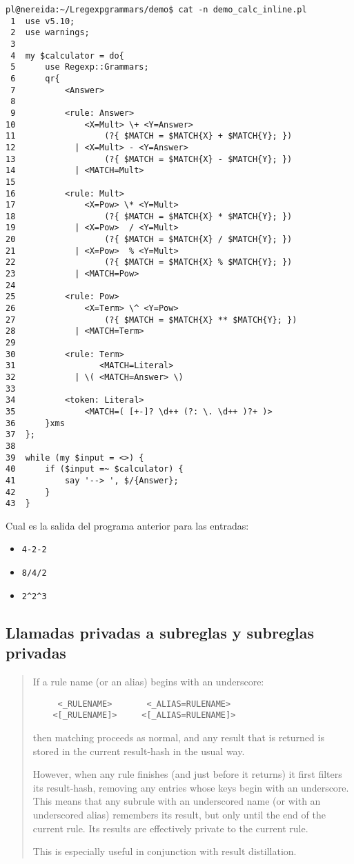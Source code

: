 \begin{verbatim}
pl@nereida:~/Lregexpgrammars/demo$ cat -n demo_calc_inline.pl
 1  use v5.10;
 2  use warnings;
 3
 4  my $calculator = do{
 5      use Regexp::Grammars;
 6      qr{
 7          <Answer>
 8
 9          <rule: Answer>
10              <X=Mult> \+ <Y=Answer>
11                  (?{ $MATCH = $MATCH{X} + $MATCH{Y}; })
12            | <X=Mult> - <Y=Answer>
13                  (?{ $MATCH = $MATCH{X} - $MATCH{Y}; })
14            | <MATCH=Mult>
15
16          <rule: Mult>
17              <X=Pow> \* <Y=Mult>
18                  (?{ $MATCH = $MATCH{X} * $MATCH{Y}; })
19            | <X=Pow>  / <Y=Mult>
20                  (?{ $MATCH = $MATCH{X} / $MATCH{Y}; })
21            | <X=Pow>  % <Y=Mult>
22                  (?{ $MATCH = $MATCH{X} % $MATCH{Y}; })
23            | <MATCH=Pow>
24
25          <rule: Pow>
26              <X=Term> \^ <Y=Pow>
27                  (?{ $MATCH = $MATCH{X} ** $MATCH{Y}; })
28            | <MATCH=Term>
29
30          <rule: Term>
31                 <MATCH=Literal>
32            | \( <MATCH=Answer> \)
33
34          <token: Literal>
35              <MATCH=( [+-]? \d++ (?: \. \d++ )?+ )>
36      }xms
37  };
38
39  while (my $input = <>) {
40      if ($input =~ $calculator) {
41          say '--> ', $/{Answer};
42      }
43  }
\end{verbatim}

\begin{exercise}
Cual es la salida del programa anterior para las entradas:
\begin{itemize}
\item \verb|4-2-2|
\item \verb|8/4/2|
\item \verb|2^2^3|
\end{itemize}
\end{exercise}

\subsection{Llamadas privadas a subreglas y subreglas privadas}

\begin{it}\begin{quotation}
If a rule name (or an alias) begins with an underscore:

\begin{verbatim}
     <_RULENAME>       <_ALIAS=RULENAME>  
    <[_RULENAME]>     <[_ALIAS=RULENAME]>
\end{verbatim}

then matching proceeds as normal, and any result that is returned is
stored in the current result-hash in the usual way.

However, when any rule finishes (and just before it returns) it first
filters its result-hash, removing any entries whose keys begin with an
underscore. This means that any subrule with an underscored name (or with
an underscored alias) remembers its result, but only until the end of
the current rule. Its results are effectively private to the current rule.

This is especially useful in conjunction with result distillation.
\end{quotation}\end{it}

